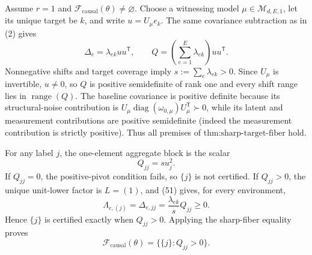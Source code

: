 Assume \(r=1\) and \(\mathcal F_{\mathrm{causal}}(\theta)\ne\varnothing\).  Choose a witnessing model \(\mu\in\mathcal M_{d,E,1}\), let its unique target be \(k\), and write \(u=U_\mu e_k\).  The same covariance subtraction as in (2) gives
\[
 \Delta_e=\lambda_{ek}uu^{\mathsf T},
 \qquad
 Q=\left(\sum_{e=1}^E\lambda_{ek}\right)uu^{\mathsf T}. \tag{51}
\]
Nonnegative shifts and target coverage imply
\(s:=\sum_e\lambda_{ek}>0\).  Since \(U_\mu\) is invertible, \(u\ne0\), so \(Q\) is positive semidefinite of rank one and every shift range lies in \(\operatorname{range}(Q)\).  The baseline covariance is positive definite because its structural-noise contribution is \(U_\mu\operatorname{diag}(\omega_{0,\mu})U_\mu^{\mathsf T}\succ0\), while its latent and measurement contributions are positive semidefinite (indeed the measurement contribution is strictly positive).  Thus all premises of \(\text{thm:sharp-target-fiber}\) hold.

For any label \(j\), the one-element aggregate block is the scalar
\[
 Q_{jj}=s u_j^2.
\]
If \(Q_{jj}=0\), the positive-pivot condition fails, so \(\{j\}\) is not certified.  If \(Q_{jj}>0\), the unique unit-lower factor is \(L=(1)\), and (51) gives, for every environment,
\[
 \Lambda_{e,(j)}=\Delta_{e,jj}
 =\frac{\lambda_{ek}}{s}Q_{jj}\ge0. \tag{52}
\]
Hence \(\{j\}\) is certified exactly when \(Q_{jj}>0\).  Applying the sharp-fiber equality proves
\[
 \mathcal F_{\mathrm{causal}}(\theta)=\{\{j\}:Q_{jj}>0\}.
\]
